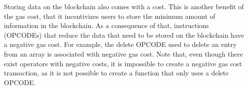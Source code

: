 {{{Storing data on the blockchain also comes with a cost. This is another benefit of the gas cost, that it incentivizes users to store the minimum amount of information in the blockchain. As a consequence of that, instructions (OPCODEs) that reduce the data that need to be stored on the blockchain have a negative gas cost. For example, the delete OPCODE used to delete an entry from an array is associated with negative gas cost. Note that, even though there exist operators with negative costs, it is impossible to create a negative gas cost transaction, as it is not possible to create a function that only uses a delete OPCODE.
}
}
}